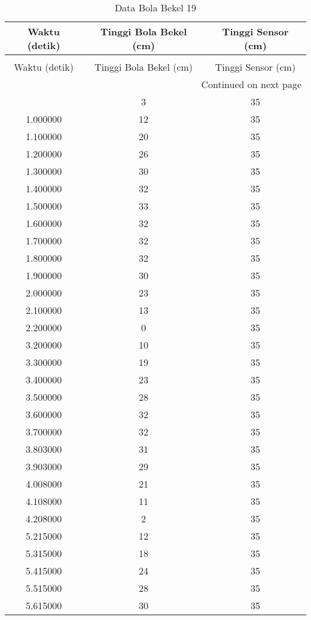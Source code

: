 \begin{longtable}[htbp]{|c|c|c|}
\caption{Data Bola Bekel 19} \\
\hline
Waktu (detik) & Tinggi Bola Bekel (cm) & Tinggi Sensor (cm) \\ \hline
\endfirsthead
\caption[]{Data Bola Bekel 19} \\
\hline
Waktu (detik) & Tinggi Bola Bekel (cm) & Tinggi Sensor (cm) \\ \hline
\endhead
\multicolumn{3}{r}{Continued on next page} \\
\endfoot
\endlastfoot
0.900000 & 3 & 35 \\ \hline
1.000000 & 12 & 35 \\ \hline
1.100000 & 20 & 35 \\ \hline
1.200000 & 26 & 35 \\ \hline
1.300000 & 30 & 35 \\ \hline
1.400000 & 32 & 35 \\ \hline
1.500000 & 33 & 35 \\ \hline
1.600000 & 32 & 35 \\ \hline
1.700000 & 32 & 35 \\ \hline
1.800000 & 32 & 35 \\ \hline
1.900000 & 30 & 35 \\ \hline
2.000000 & 23 & 35 \\ \hline
2.100000 & 13 & 35 \\ \hline
2.200000 & 0 & 35 \\ \hline
3.200000 & 10 & 35 \\ \hline
3.300000 & 19 & 35 \\ \hline
3.400000 & 23 & 35 \\ \hline
3.500000 & 28 & 35 \\ \hline
3.600000 & 32 & 35 \\ \hline
3.700000 & 32 & 35 \\ \hline
3.803000 & 31 & 35 \\ \hline
3.903000 & 29 & 35 \\ \hline
4.008000 & 21 & 35 \\ \hline
4.108000 & 11 & 35 \\ \hline
4.208000 & 2 & 35 \\ \hline
5.215000 & 12 & 35 \\ \hline
5.315000 & 18 & 35 \\ \hline
5.415000 & 24 & 35 \\ \hline
5.515000 & 28 & 35 \\ \hline
5.615000 & 30 & 35 \\ \hline

\end{longtable}
